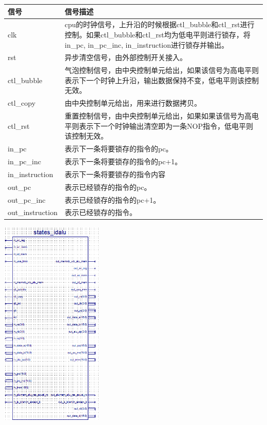 \begin{center}
    \label{table:ifid}
    \begin{longtable}{p{}p{}}
        \toprule
        信号 & 信号描述 \\
        \midrule
        clk & cpu的时钟信号，上升沿的时候根据ctl\_bubble和ctl\_rst进行控制。如果ctl\_bubble和ctl\_rst均为低电平则进行锁存，将in\_pc, in\_pc\_inc, in\_instruction进行锁存并输出。 \\
        rst & 异步清空信号，由外部控制开关接入。 \\
        ctl\_bubble & 气泡控制信号，由中央控制单元给出，如果该信号为高电平则表示下一个时钟上升沿，输出数据保持不变，低电平则该控制无效。 \\
        ctl\_copy &  由中央控制单元给出，用来进行数据拷贝。\\
        ctl\_rst & 重置控制信号，由中央控制单元给出，如果如果该信号为高电平则表示下一个时钟输出清空即为一条NOP指令，低电平则该控制无效。 \\
        in\_pc & 表示下一条将要锁存的指令的pc。 \\
        in\_pc\_inc & 表示下一条将要锁存的指令的pc+1。 \\
        in\_instruction & 表示下一条将要锁存的指令内容 \\
        out\_pc & 表示已经锁存的指令的pc。 \\
        out\_pc\_inc & 表示已经锁存的指令的pc+1。 \\
        out\_instruction & 表示已经锁存的指令。 \\
        \bottomrule
    \end{longtable}
\end{center}

\begin{center}
    \includegraphics[height=10cm]{image/detail/detail_idalu.png}
    \label{fig:idalu}
\end{center}

